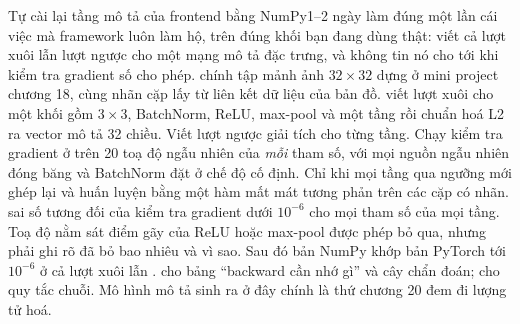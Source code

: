 \documentclass[../../deep_learning.tex]{subfiles}
\begin{document}
\begin{duan}{Tự cài lại tầng mô tả của frontend bằng NumPy}{1--2 ngày}
\dmt làm đúng một lần cái việc mà framework luôn làm hộ, trên đúng khối bạn đang dùng thật: viết cả lượt xuôi lẫn lượt ngược cho một mạng mô tả đặc trưng, và không tin nó cho tới khi kiểm tra gradient số cho phép.
\ddl chính tập mảnh ảnh $32\times32$ dựng ở mini project chương 18, cùng nhãn cặp lấy từ liên kết dữ liệu của bản đồ.
\dbc viết lượt xuôi cho một khối gồm  $3\times3$, BatchNorm, ReLU, max-pool và một tầng  rồi chuẩn hoá L2 ra vector mô tả 32 chiều. Viết lượt ngược giải tích cho từng tầng. Chạy kiểm tra gradient ở  trên 20 toạ độ ngẫu nhiên của \emph{mỗi} tham số, với mọi nguồn ngẫu nhiên đóng băng và BatchNorm đặt ở chế độ cố định. Chỉ khi mọi tầng qua ngưỡng mới ghép lại và huấn luyện bằng một hàm mất mát tương phản trên các cặp có nhãn.
\dxk sai số tương đối của kiểm tra gradient dưới $10^{-6}$ cho mọi tham số của mọi tầng. Toạ độ nằm sát điểm gãy của ReLU hoặc max-pool được phép bỏ qua, nhưng phải ghi rõ đã bỏ bao nhiêu và vì sao. Sau đó bản NumPy khớp bản PyTorch tới $10^{-6}$ ở cả lượt xuôi lẫn .
\dnv {} cho bảng ``backward cần nhớ gì'' và cây chẩn đoán;  cho quy tắc chuỗi. Mô hình mô tả sinh ra ở đây chính là thứ chương 20 đem đi lượng tử hoá.
\end{duan}

\begin{traloi}
\end{traloi}
\end{document}
